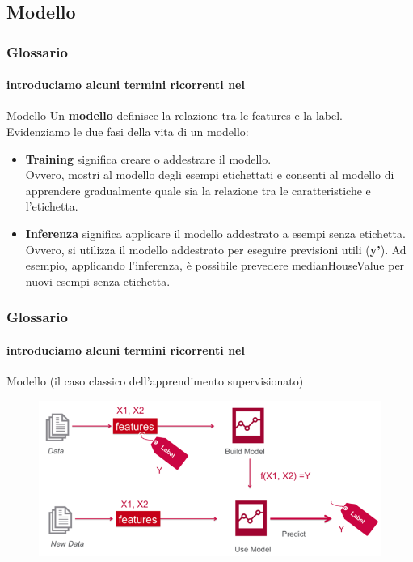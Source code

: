 \subsection[Modello]{Modello}
\begin{frame}

	\frametitle{Glossario}
	\framesubtitle{introduciamo alcuni termini ricorrenti nel \ml}

	\begin{block}{Modello}
		Un \textbf{modello} definisce la relazione tra le features e la label.\\
		\vspace{2mm}
		Evidenziamo le due fasi della vita di un modello:
		\begin{itemize}
			\item \textbf{Training} significa creare o addestrare il modello.\\
					Ovvero, mostri al modello degli esempi etichettati e consenti al modello di apprendere gradualmente quale sia la relazione tra le caratteristiche e l'etichetta.
			\item \textbf{Inferenza} significa applicare il modello addestrato a esempi senza etichetta.\\
				Ovvero, si utilizza il modello addestrato per eseguire previsioni utili (\textbf{y'}). Ad esempio, applicando l'inferenza, è possibile prevedere medianHouseValue per nuovi esempi senza etichetta.
		\end{itemize}

	\end{block}

\end{frame}


\begin{frame}

	\frametitle{Glossario}
	\framesubtitle{introduciamo alcuni termini ricorrenti nel \ml}

	\begin{block}{Modello (il caso classico dell'apprendimento supervisionato)}
		\begin{figure}[!htbp]
			\centering
			\includegraphics[width=11.9cm]{images/glossary/supervised_learning_1.png}
			\label{fig:glossary_supervised_learning_1}
		\end{figure}

	\end{block}

\end{frame}


